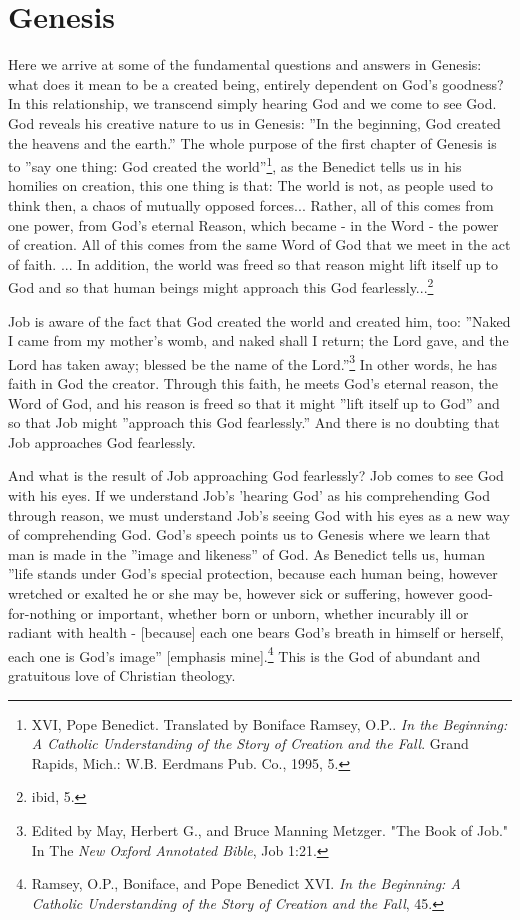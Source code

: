 	\section{Genesis}
Here we arrive at some of the fundamental questions and answers in Genesis: what does it mean to be a created being, entirely dependent on God's goodness? In this relationship, we transcend simply hearing God and we come to see God. God reveals his creative nature to us in Genesis: ''In the beginning, God created the heavens and the earth.'' The whole purpose of the first chapter of Genesis is to ''say one thing: God created the world''\footnote{XVI, Pope Benedict. Translated by Boniface Ramsey, O.P.. \emph{In the Beginning: A Catholic Understanding of the Story of Creation and the Fall}. Grand Rapids, Mich.: W.B. Eerdmans Pub. Co., 1995, 5.}, as the Benedict tells us in his homilies on creation, this one thing is that: 
The world is not, as people used to think then, a chaos of mutually opposed forces... Rather, all of this comes from one power, from God's eternal Reason, which became - in the Word - the power of creation. All of this comes from the same Word of God that we meet in the act of faith. ... In addition, the world was freed so that reason might lift itself up to God and so that human beings might approach this God fearlessly...\footnote{ibid, 5.}


Job is aware of the fact that God created the world and created him, too: ''Naked I came from my mother's womb, and naked shall I return; the Lord gave, and the Lord has taken away; blessed be the name of the Lord.''\footnote{Edited by May, Herbert G., and Bruce Manning Metzger. "The Book of Job." In The \emph{New Oxford Annotated Bible}, Job 1:21.} In other words, he has faith in God the creator. Through this faith, he meets God's eternal reason, the Word of God, and his reason is freed so that it might ''lift itself up to God'' and so that Job might ''approach this God fearlessly.'' And there is no doubting that Job approaches God fearlessly.

And what is the result of Job approaching God fearlessly? Job comes to see God with his eyes. If we understand Job's 'hearing God' as his comprehending God through reason, we must understand Job's seeing God with his eyes as a new way of comprehending God. God's speech points us to Genesis where we learn that man is made in the ''image and likeness'' of God. As Benedict tells us, human ''life stands under God's special protection, because each human being, however wretched or exalted he or she may be, however sick or suffering, however good-for-nothing or important, whether born or unborn, whether incurably ill or radiant with health - [because] each one bears God's breath in himself or herself, each one is God's image'' [emphasis mine].\footnote{Ramsey, O.P., Boniface, and Pope Benedict XVI. \emph{In the Beginning: A Catholic Understanding of the Story of Creation and the Fall}, 45.} This is the God of abundant and gratuitous love of Christian theology.

